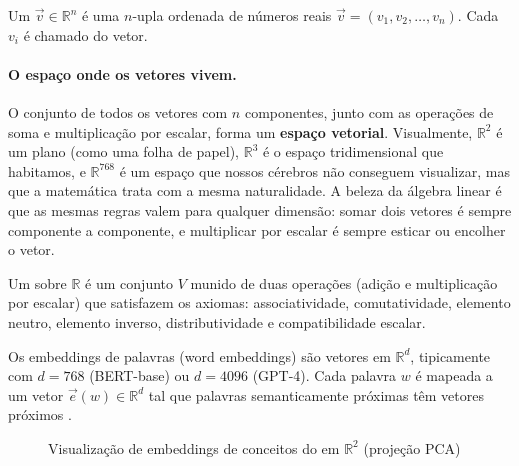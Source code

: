 \begin{definicao}[Vetor]
    Um  $\vec{v} \in \mathbb{R}^n$ é uma $n$-upla ordenada
    de números reais $\vec{v} = (v_1, v_2, \ldots, v_n)$. Cada $v_i$ é
    chamado  do vetor.
\end{definicao}

\paragraph{O espaço onde os vetores vivem.} O conjunto de todos os vetores
com $n$ componentes, junto com as operações de soma e multiplicação por
escalar, forma um \textbf{espaço vetorial}. Visualmente, $\mathbb{R}^2$ é um
plano (como uma folha de papel), $\mathbb{R}^3$ é o espaço tridimensional
que habitamos, e $\mathbb{R}^{768}$ é um espaço que nossos cérebros não
conseguem visualizar, mas que a matemática trata com a mesma naturalidade.
A beleza da álgebra linear é que as mesmas regras valem para qualquer
dimensão: somar dois vetores é sempre componente a componente, e
multiplicar por escalar é sempre esticar ou encolher o vetor.

\begin{definicao}
    Um  sobre $\mathbb{R}$ é um conjunto $V$
    munido de duas operações (adição e multiplicação por escalar) que
    satisfazem os axiomas: associatividade, comutatividade, elemento neutro,
    elemento inverso, distributividade e compatibilidade escalar.
\end{definicao}

\begin{exemplo}
    Os embeddings de palavras (word embeddings) são vetores em
    $\mathbb{R}^d$, tipicamente com $d = 768$ (BERT-base) ou $d = 4096$
    (GPT-4). Cada palavra $w$ é mapeada a um vetor $\vec{e}(w) \in
    \mathbb{R}^d$ tal que palavras semanticamente próximas têm vetores
    próximos \cite{devlin2019bert, vaswani2017attention}.
\end{exemplo}

\begin{figure}[htb]
    \centering
    \caption{Visualização de embeddings de conceitos do \opencodeeco{} em
             $\mathbb{R}^2$ (projeção PCA)}
    \label{fig:embeddings}
\end{figure}

